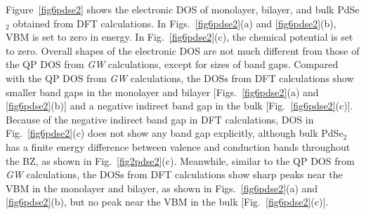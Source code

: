 \documentclass[aps,prb,longbibliography,twocolumn]{revtex4-2}
\begin{document}
Figure~\ref{fig6pdse2} shows the electronic DOS of monolayer, bilayer, and bulk PdSe$_2$ obtained from DFT calculations.
In Figs.~\ref{fig6pdse2}(a) and \ref{fig6pdse2}(b), VBM is set to zero in energy.
In Fig.~\ref{fig6pdse2}(c), the chemical potential is set to zero.
Overall shapes of the electronic DOS are not much different from those 
of the QP DOS from {\em GW} calculations, except for sizes of band gaps.
Compared with the QP DOS from {\em GW} calculations,
the DOSs from DFT calculations show smaller band gaps in the monolayer and 
bilayer [Figs.~\ref{fig6pdse2}(a) and \ref{fig6pdse2}(b)] and a negative indirect band gap in the bulk [Fig.~\ref{fig6pdse2}(c)].
Because of the negative indirect band gap in DFT calculations,
DOS in Fig.~\ref{fig6pdse2}(c) does not show any band gap explicitly,
although bulk PdSe$_2$ has a finite energy difference between valence and 
conduction bands throughout the BZ, as shown in Fig.~\ref{fig2pdse2}(c).
Meanwhile, similar to the QP DOS from {\em GW} calculations, the DOSs from DFT calculations 
show sharp peaks near the VBM in the monolayer and bilayer, 
as shown in Figs.~\ref{fig6pdse2}(a) and \ref{fig6pdse2}(b), but no peak near the VBM in the bulk [Fig.~\ref{fig6pdse2}(c)].


\end{document}

